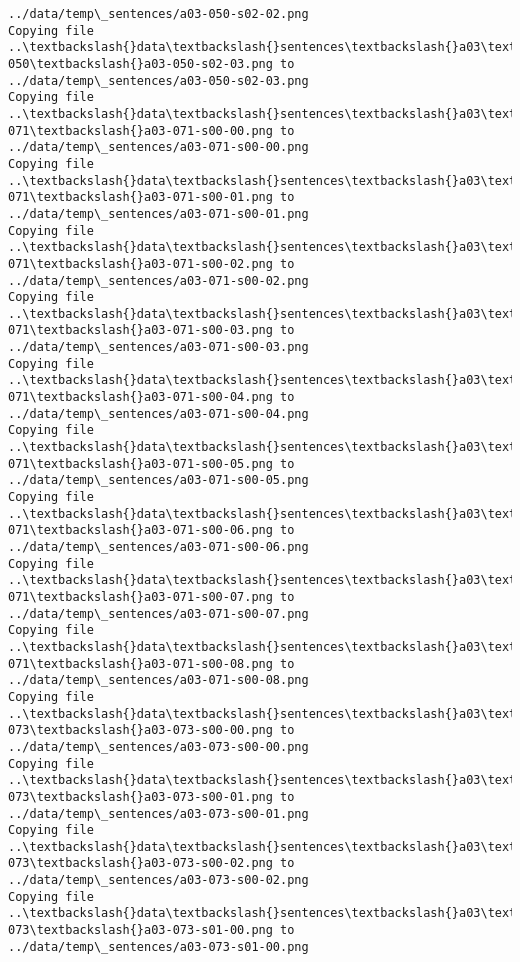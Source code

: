 \documentclass[11pt]{article}
\begin{document}
\begin{Verbatim}[commandchars=\\\{\}]
../data/temp\_sentences/a03-050-s02-02.png
Copying file ..\textbackslash{}data\textbackslash{}sentences\textbackslash{}a03\textbackslash{}a03-050\textbackslash{}a03-050-s02-03.png to
../data/temp\_sentences/a03-050-s02-03.png
Copying file ..\textbackslash{}data\textbackslash{}sentences\textbackslash{}a03\textbackslash{}a03-071\textbackslash{}a03-071-s00-00.png to
../data/temp\_sentences/a03-071-s00-00.png
Copying file ..\textbackslash{}data\textbackslash{}sentences\textbackslash{}a03\textbackslash{}a03-071\textbackslash{}a03-071-s00-01.png to
../data/temp\_sentences/a03-071-s00-01.png
Copying file ..\textbackslash{}data\textbackslash{}sentences\textbackslash{}a03\textbackslash{}a03-071\textbackslash{}a03-071-s00-02.png to
../data/temp\_sentences/a03-071-s00-02.png
Copying file ..\textbackslash{}data\textbackslash{}sentences\textbackslash{}a03\textbackslash{}a03-071\textbackslash{}a03-071-s00-03.png to
../data/temp\_sentences/a03-071-s00-03.png
Copying file ..\textbackslash{}data\textbackslash{}sentences\textbackslash{}a03\textbackslash{}a03-071\textbackslash{}a03-071-s00-04.png to
../data/temp\_sentences/a03-071-s00-04.png
Copying file ..\textbackslash{}data\textbackslash{}sentences\textbackslash{}a03\textbackslash{}a03-071\textbackslash{}a03-071-s00-05.png to
../data/temp\_sentences/a03-071-s00-05.png
Copying file ..\textbackslash{}data\textbackslash{}sentences\textbackslash{}a03\textbackslash{}a03-071\textbackslash{}a03-071-s00-06.png to
../data/temp\_sentences/a03-071-s00-06.png
Copying file ..\textbackslash{}data\textbackslash{}sentences\textbackslash{}a03\textbackslash{}a03-071\textbackslash{}a03-071-s00-07.png to
../data/temp\_sentences/a03-071-s00-07.png
Copying file ..\textbackslash{}data\textbackslash{}sentences\textbackslash{}a03\textbackslash{}a03-071\textbackslash{}a03-071-s00-08.png to
../data/temp\_sentences/a03-071-s00-08.png
Copying file ..\textbackslash{}data\textbackslash{}sentences\textbackslash{}a03\textbackslash{}a03-073\textbackslash{}a03-073-s00-00.png to
../data/temp\_sentences/a03-073-s00-00.png
Copying file ..\textbackslash{}data\textbackslash{}sentences\textbackslash{}a03\textbackslash{}a03-073\textbackslash{}a03-073-s00-01.png to
../data/temp\_sentences/a03-073-s00-01.png
Copying file ..\textbackslash{}data\textbackslash{}sentences\textbackslash{}a03\textbackslash{}a03-073\textbackslash{}a03-073-s00-02.png to
../data/temp\_sentences/a03-073-s00-02.png
Copying file ..\textbackslash{}data\textbackslash{}sentences\textbackslash{}a03\textbackslash{}a03-073\textbackslash{}a03-073-s01-00.png to
../data/temp\_sentences/a03-073-s01-00.png

\end{Verbatim}
\end{document}
